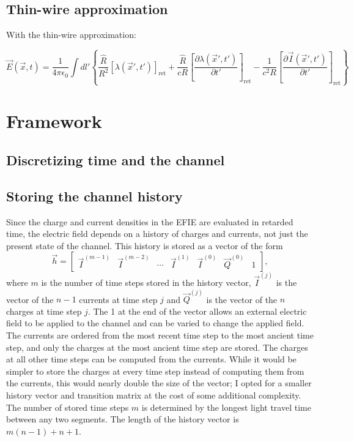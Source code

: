 \documentclass{article}
\begin{document}
\subsection{Thin-wire approximation}
With the thin-wire approximation:

\begin{equation}
\label{EFIE1d}
\vec{E}(\vec{x}, t) = \frac{1}{4\pi\epsilon_0} \int dl' \left\{ \frac{\hat{R}}{R^2} \left[\lambda(\vec{x}', t')\right]_\text{ret} + \frac{\hat{R}}{cR} \left[\frac{\partial\lambda(\vec{x}', t')}{\partial t'}\right]_\text{ret} - \frac{1}{c^2R} \left[\frac{\partial\vec{I}(\vec{x}', t')}{\partial t'}\right]_\text{ret}\right\}
\end{equation}

\section{Framework}
\subsection{Discretizing time and the channel}

\subsection{Storing the channel history}
Since the charge and current densities in the EFIE are evaluated in retarded time, the electric field depends on a history of charges and currents, not just the present state of the channel. This history is stored as a vector of the form
\begin{equation}
\vec{h} = 
\begin{bmatrix}
\vec{I}^{(m-1)} & \vec{I}^{(m-2)} & \cdots & \vec{I}^{(1)} & \vec{I}^{(0)} & \vec{Q}^{(0)} & 1
\end{bmatrix},
\end{equation}
where $m$ is the number of time steps stored in the history vector, $\vec{I}^{(j)}$ is the vector of the $n-1$ currents at time step $j$ and $\vec{Q}^{(j)}$ is the vector of the $n$ charges at time step $j$. The 1 at the end of the vector allows an external electric field to be applied to the channel and can be varied to change the applied field. The currents are ordered from the most recent time step to the most ancient time step, and only the charges at the most ancient time step are stored. The charges at all other time steps can be computed from the currents. While it would be simpler to store the charges at every time step instead of computing them from the currents, this would nearly double the size of the vector; I opted for a smaller history vector and transition matrix at the cost of some additional complexity. The number of stored time steps $m$ is determined by the longest light travel time between any two segments. The length of the history vector is $m(n-1)+n+1$.
\end{document}
